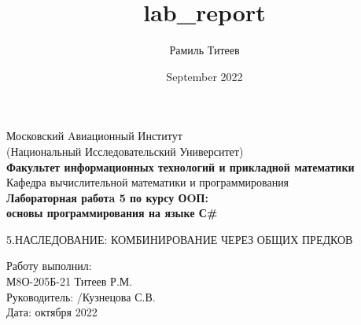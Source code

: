 \documentclass[12pt]{report}
\title{lab_report}
\author{Рамиль Титеев}
\date{September 2022}
\begin{document}
    \begin{titlepage}
        \begin{center}
            \large{Московский Aвиационный Институт}\\
            \large{(Национальный Исследовательский Университет)}\\
            \vspace{0.4in}
            \textbf{\LARGE{Факультет информационных технологий и прикладной математики}}\\
            \vspace{0.4in}
            \large{Кафедра вычислительной математики и программирования}\\
            \vspace{0.4in}
            \textbf{\LARGE{Лабораторная работa 5 по курсу ОOП:}}\\
            \textbf{\LARGE{основы программирования на языке С\#}}\\
        \end{center}
        \vspace{0.6in}
        \small{5.НАСЛЕДОВАНИЕ: КОМБИНИРОВАНИЕ ЧЕРЕЗ ОБЩИХ ПРЕДКОВ }\\
        \vfill
        \begin{flushleft}
                \large{ 
                    Работу выполнил:\\
                    М8О-205Б-21 \hspace{0.1in} 
                    Титеев Р.М. \hspace{0.3in}  
                    \hspace{0.3in} 
                    \\ 
                    Руководитель: /Кузнецова С.В. \\
                    Дата: \underline{\hspace{0.4in}} октября 2022\\
                }
        \end{flushleft}        
    \end{titlepage}
\end{document}
